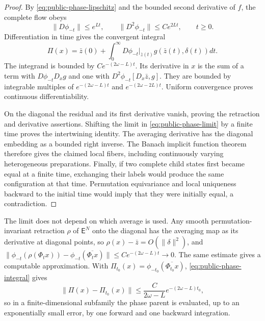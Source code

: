 \begin{proof}
By \cref{eq:public-phase-lipschitz} and the bounded second derivative of $f$, the complete flow obeys
\begin{equation}
 \|D\phi_{-t}\|\le e^{Lt},\qquad
 \|D^2\phi_{-t}\|\le C e^{2Lt},\qquad t\ge0.
 \label{eq:public-phase-backward}
\end{equation}
Differentiation in time gives the convergent integral
\begin{equation}
 \Pi(x)=\bar z(0)+\int_0^\infty
 D\phi_{-t}\big|_{\bar z(t)}g(\bar z(t),\delta(t))dt.
 \label{eq:public-phase-integral}
\end{equation}
The integrand is bounded by $Ce^{-(2\omega-L)t}$. Its derivative in $x$ is the sum of a term with $D\phi_{-t}D_xg$ and one with $D^2\phi_{-t}[D_x\bar z,g]$. They are bounded by integrable multiples of $e^{-(2\omega-L)t}$ and $e^{-(2\omega-2L)t}$. Uniform convergence proves continuous differentiability.

On the diagonal the residual and its first derivative vanish, proving the retraction and derivative assertions. Shifting the limit in \cref{eq:public-phase-limit} by a finite time proves the intertwining identity. The averaging derivative has the diagonal embedding as a bounded right inverse. The Banach implicit function theorem therefore gives the claimed local fibers, including continuously varying heterogeneous preparations. Finally, if two complete child states first became equal at a finite time, exchanging their labels would produce the same configuration at that time. Permutation equivariance and local uniqueness backward to the initial time would imply that they were initially equal, a contradiction.
\end{proof}

The limit does not depend on which average is used. Any smooth permutation-invariant retraction $\rho$ of $\mathsf E^N$ onto the diagonal has the averaging map as its derivative at diagonal points, so $\rho(x)-\bar z=O(\|\delta\|^2)$, and $\|\phi_{-t}(\rho(\Phi_tx))-\phi_{-t}(\overline{\Phi_tx})\|\le Ce^{-(2\omega-L)t}\to0$. The same estimate gives a computable approximation. With $\Pi_{t_0}(x)=\phi_{-t_0}(\overline{\Phi_{t_0} x})$, \cref{eq:public-phase-integral} gives
\begin{equation}
 \|\Pi(x)-\Pi_{t_0}(x)\|\le\frac{C}{2\omega-L}e^{-(2\omega-L)t_0},
 \label{eq:public-phase-truncation}
\end{equation}
so in a finite-dimensional subfamily the phase parent is evaluated, up to an exponentially small error, by one forward and one backward integration.

